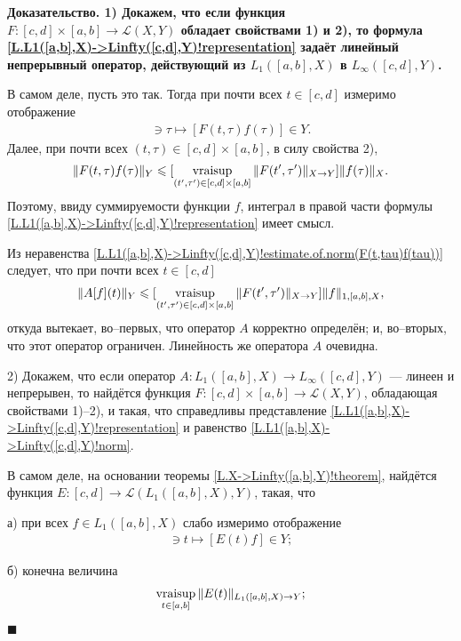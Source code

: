 \documentclass{report}
\newcounter{rem}[section]
\newcounter{theor}[section]
\newenvironment{Proof}{\par\noindent\bf Доказательство.\rm}{ $\blacksquare$\par}
\newcommand{\vraisup}{\mathop{\rm vraisup}}
\begin{document}
\begin{Proof}
1) Докажем, что если функция $F:[c,d]\times[a,b]\to\mathcal{L}(X,Y)$ обладает свойствами 1) и 2), то формула \eqref{L.L1([a,b],X)->Linfty([c,d],Y)!representation} задаёт линейный
непрерывный оператор, действующий из $L_1([a,b],X)$ в $L_\infty([c,d],Y)$.

В самом деле, пусть это так. Тогда при почти всех $t\in[c,d]$ измеримо отображение
\begin{gather*}
[a,b]\ni\tau\mapsto [F(t,\tau)f(\tau)]\in Y.
\end{gather*}
Далее, при почти всех $(t,\tau)\in[c,d]\times[a,b]$, в силу свойства 2),
\begin{gather}\label{L.L1([a,b],X)->Linfty([c,d],Y)!estimate.of.norm(F(t,tau)f(tau))}
\|F(t,\tau)f(\tau)\|_Y\leqslant[\vraisup\limits_{(t',\tau')\in[c,d]\times[a,b]}\|F(t',\tau')\|_{X\to Y}]\|f(\tau)\|_X.
\end{gather}
Поэтому, ввиду суммируемости функции $f$, интеграл в правой части формулы \eqref{L.L1([a,b],X)->Linfty([c,d],Y)!representation} имеет смысл.

Из неравенства \eqref{L.L1([a,b],X)->Linfty([c,d],Y)!estimate.of.norm(F(t,tau)f(tau))} следует, что при почти всех $t\in[c,d]$
\begin{gather*}
\|A[f](t)\|_Y\leqslant[\vraisup\limits_{(t',\tau')\in[c,d]\times[a,b]}\|F(t',\tau')\|_{X\to Y}]\|f\|_{1,[a,b],X},
\end{gather*}
откуда вытекает, во--первых, что оператор $A$ корректно определён; и, во--вторых, что этот оператор ограничен. Линейность же оператора $A$ очевидна.

2) Докажем, что если оператор $A:L_1([a,b],X)\to L_\infty([c,d],Y)$ --- линеен и непрерывен, то найдётся функция $F:[c,d]\times[a,b]\to\mathcal{L}(X,Y)$, обладающая свойствами 1)--2),
и такая, что справедливы представление \eqref{L.L1([a,b],X)->Linfty([c,d],Y)!representation} и равенство \eqref{L.L1([a,b],X)->Linfty([c,d],Y)!norm}.

В самом деле, на основании теоремы \ref{L.X->Linfty([a,b],Y)!theorem}, найдётся функция $E:[c,d]\to\mathcal{L}(L_1([a,b],X),Y)$, такая, что

а) при всех $f\in L_1([a,b],X)$ слабо измеримо отображение
\begin{gather*}
[c,d]\ni t\mapsto[E(t)f]\in Y;
\end{gather*}

б) конечна величина
\begin{gather*}
\vraisup\limits_{t\in[a,b]}\|E(t)\|_{L_1([a,b],X)\to Y};
\end{gather*}


\end{Proof}
\end{document}
